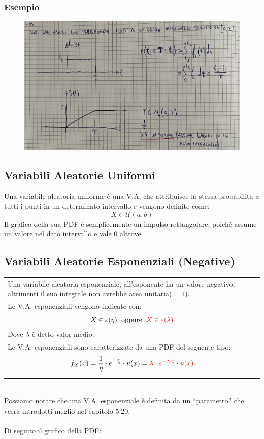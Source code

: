 \documentclass{article}
\begin{document}
\subsubsection{\underline{Esempio}}
\begin{figure}[ht]
\centering
\includegraphics[scale=0.12]{ese/14.jpeg}
\end{figure}

\subsection{Variabili Aleatorie Uniformi}
Una variabile aleatoria uniforme è una V.A. che attribuisce la stessa probabilità a tutti i punti in un determinato intervallo e vengono definite come:
\[X \in \mathcal{U}(a,b)\]
Il grafico della sua PDF è semplicemente un impulso rettangolare, poiché assume un valore nel dato intervallo e vale $0$ altrove.

\subsection{Variabili Aleatorie Esponenziali (Negative)}
\begin{tabular}{|p{13cm}}
Una variabile aleatoria esponenziale, all’esponente ha un valore negativo, altrimenti il suo integrale non avrebbe area unitaria($=1$). \\
Le V.A. esponenziali vengono indicate con:
\[X \in \varepsilon(\eta) \;\text{ oppure }\; \color{red} X \in \varepsilon(\lambda)\]
Dove $\lambda$ è detto valor medio. \\
Le V.A. esponenziali sono caratterizzate da una PDF del seguente tipo:
\[f_X(x) = \frac 1 \eta \cdot e^{- \frac x \eta} \cdot u(x) = \color{red} \lambda \cdot e^{-\lambda \cdot x} \cdot u(x)\]
\end{tabular} \\
Possiamo notare che una V.A. esponenziale è definita da un “parametro” che verrà introdotti meglio nel capitolo 5.20. \\ \\
Di seguito il grafico della PDF:
\end{document}
